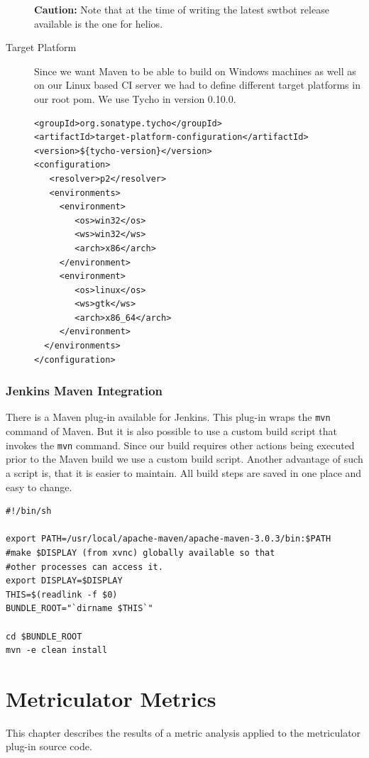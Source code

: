 \documentclass[11pt,a4paper,oneside]{scrreprt}
\begin{document}
\begin{description}
\textbf{Caution:} Note that at the time of writing the latest swtbot release available is the one for helios.

\item[Target Platform]
Since we want Maven to be able to build on Windows machines as well as on our Linux based CI server we had to define different target platforms in our root pom. We use Tycho in version 0.10.0.
\begin{lstlisting}[style=Xml, caption=Maven target platform configuration]
<groupId>org.sonatype.tycho</groupId>
<artifactId>target-platform-configuration</artifactId>
<version>${tycho-version}</version>
<configuration>
   <resolver>p2</resolver>
   <environments>
     <environment>
        <os>win32</os>
		<ws>win32</ws>
		<arch>x86</arch>
     </environment>
     <environment>
		<os>linux</os>
		<ws>gtk</ws>
    	<arch>x86_64</arch>
     </environment>
  </environments>
</configuration>
\end{lstlisting}

\end{description}

\subsection{Jenkins Maven Integration}
There is a Maven plug-in available for Jenkins. This plug-in wraps the \texttt{mvn} command of Maven. But it is also possible to use a custom build script that invokes the \texttt{mvn} command. Since our build requires other actions being executed prior to the Maven build we use a custom build script. Another advantage of such a script is, that it is easier to maintain. All build steps are saved in one place and easy to change.

\begin{lstlisting}[style=console, caption=Jenkins build script]
#!/bin/sh

export PATH=/usr/local/apache-maven/apache-maven-3.0.3/bin:$PATH
#make $DISPLAY (from xvnc) globally available so that
#other processes can access it.
export DISPLAY=$DISPLAY
THIS=$(readlink -f $0)
BUNDLE_ROOT="`dirname $THIS`"

cd $BUNDLE_ROOT
mvn -e clean install
\end{lstlisting}

\chapter{Metriculator Metrics}
This chapter describes the results of a metric analysis applied to the metriculator plug-in source code.
\end{document}
